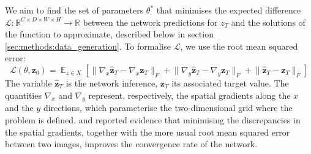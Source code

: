 \documentclass[utf8]{frontiersSCNS} %
\begin{document}
We aim to find the set of parameters $\theta^*$ that minimises the expected difference $\mathcal{L}: \mathbb{R}^{C \times D \times W \times H} \rightarrow \mathbb{R}$ between the network predictions for $z_{T}$ and the solutions of the function to approximate, described below in section \ref{sec:methods:data_generation}. To formalise $\mathcal{L}$, we use the root mean squared error:
\begin{equation}\label{eq:loss}
    \mathcal{L}(\theta, \mathbf{z}_0) =
    \mathop{\mathbb{E}}_{z \in X}
    \left[
    \lVert\nabla_x \mathbf{\hat{z}}_{T} - \nabla_x \mathbf{z}_{T}\rVert_F + 
    \lVert\nabla_y \mathbf{\hat{z}}_{T} - \nabla_y \mathbf{z}_{T}\rVert_F + 
    \lVert\mathbf{\hat{z}}_{T} - \mathbf{z}_{T}\rVert_F
    \right]
\end{equation}
The variable $\mathbf{\hat{z}}_{T}$ is the network inference, $\mathbf{z}_{T}$ its associated target value. The quantities $\nabla_x$ and $\nabla_y$ represent, respectively, the spatial gradients along the $x$ and the $y$ directions, which parameterise the two-dimensional grid where the problem is defined. 
\cite{kim2019deep} and \cite{Lino2020SimulatingNetworks} reported evidence that minimising the discrepancies in the spatial gradients, together with the more usual root mean squared error between two images, improves the convergence rate of the network.
\end{document}
